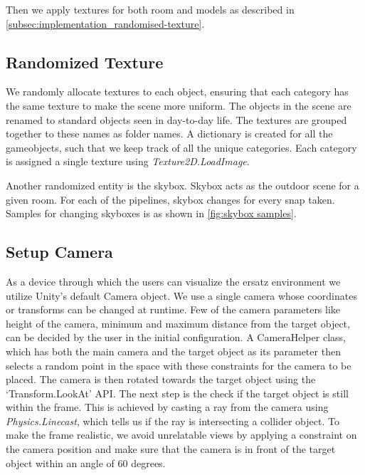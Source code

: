 Then we apply textures for both room and models as described in \autoref{subsec:implementation_randomised-texture}.

\subsection{Randomized Texture}\label{subsec:implementation_randomised-texture}
We randomly allocate textures to each object, ensuring that each category has the same texture to make the scene more uniform.
The objects in the scene are renamed to standard objects seen in day-to-day life.
The textures are grouped together to these names as folder names.
A dictionary is created for all the gameobjects, such that we keep track of all the unique categories.
Each category is assigned a single texture using \emph{Texture2D.LoadImage}.

Another randomized entity is the skybox.
Skybox acts as the outdoor scene for a given room.
For each of the pipelines, skybox changes for every snap taken.
Samples for changing skyboxes is as shown in \autoref{fig:skybox samples}.

\subsection{Setup Camera}\label{subsec:implementation_camera}
As a device through which the users can visualize the ersatz environment we utilize Unity's default Camera object.
We use a single camera whose coordinates or transforms can be changed at runtime.
Few of the camera parameters like height of the camera, minimum and maximum distance from the target object, can be decided by the user in the initial configuration.
A CameraHelper class, which has both the main camera and the target object as its parameter then selects a random point in the space with these constraints for the camera to be placed.
The camera is then rotated towards the target object using the `Transform.LookAt' API.
The next step is the check if the target object is still within the frame.
This is achieved by casting a ray from the camera using \emph{Physics.Linecast}, which tells us if the ray is intersecting a collider object.
To make the frame realistic, we avoid unrelatable views by applying a constraint on the camera position and make sure that the camera is in front of the target object within an angle of 60 degrees.

